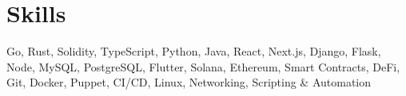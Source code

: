 
\section{Skills}

\begin{itemize}[leftmargin=0.15in, label={}]

\small{\item{{Go, Rust, Solidity, TypeScript, Python, Java, React, Next.js, Django, Flask, Node, MySQL, PostgreSQL, Flutter, Solana, Ethereum, Smart Contracts, DeFi, Git, Docker, Puppet, CI/CD, Linux, Networking, Scripting \& Automation} \\
}}

\end{itemize}